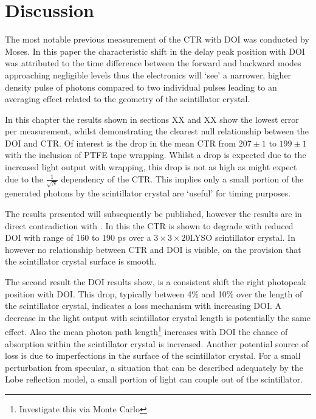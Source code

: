 \section{Discussion}
The most notable previous measurement of the CTR with DOI was conducted by Moses\cite{Moses1999}. In this paper the characteristic shift in the delay peak position with DOI was attributed to the time difference between the forward and backward modes approaching negligible levels thus the electronics will `see' a narrower, higher density pulse of photons compared to two individual pulses leading to an averaging effect related to the geometry of the scintillator crystal. 

In this chapter the results shown in sections XX and XX show the lowest error per measurement, whilst demonstrating the clearest null relationship between the DOI and CTR.  Of interest is the drop in the mean CTR from $207\pm1$ to $199\pm1$ with the inclusion of PTFE tape wrapping. Whilst a drop is expected due to the increased light output with wrapping, this drop is not as high as might expect due to the $\frac{1}{\sqrt{N}}$ dependency of the CTR. This implies only a small portion of the generated photons by the scintillator crystal are `useful' for timing purposes.

The results presented will subsequently be published, however the results are in direct contradiction with \cite{Yeom2013}. In this the CTR is shown to degrade with reduced DOI with range of 160 to 190 ps over a $3\times3\times20$\mmc LYSO scintillator crystal. In \cite{Bircher2012} however no relationship between CTR and DOI is visible, on the provision that the scintillator crystal surface is smooth.

The second result the DOI results show, is a consistent shift the right photopeak position with DOI. This drop, typically between 4\% and 10\% over the length of the scintillator crystal, indicates a loss mechanism with increasing DOI. A decrease in the light output with scintillator crystal length\cite{sta_Mayhugh_Wolski_Flyckt_1997} is potentially the same effect. Also the mean photon path length\footnote{Investigate this via Monte Carlo} increases with DOI the chance of absorption within the scintillator crystal is increased. Another potential source of loss is due to imperfections in the surface of the scintillator crystal. For a small perturbation from specular, a situation that can be described adequately by the Lobe reflection model\cite{Janecek_Moses_2008}, a small portion of light can couple out of the scintillator.